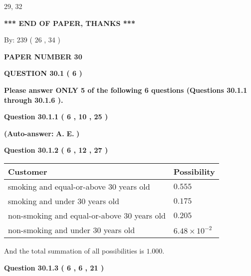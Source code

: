 \documentclass[12pt]{article}
\begin{document}
29,  %
32
 
   
   
   
   
\vspace{1.0in} 
{\textbf{\large{ *** END OF PAPER, THANKS *** }}} 
   
   
\hspace{1.0in} By: 
         239 (          26 ,           34 )
   
   
   
   
\newpage 
\setcounter{page}{ 
    30001 } 
   
   
 {\textbf{ \Large{ PAPER NUMBER           30  }}}
   
   
   
   
  
\vspace{0.2in}
  
{\textbf{\Large{QUESTION
30.1 
 (           6 )
}}}
  
  
{\textbf{\Large{Please answer ONLY  %
           5  %
 of the following  %
           6  %
 questions (Questions  %
30.1.1 %
 through  %
30.1.6 %
 ). }}}
   
   
  
  
{\textbf{\large{Question
30.1.1 
 (           6 ,          10 ,          25 )
}}}
 
 
{\textbf{(Auto-answer:}}
{\textbf{\large{
A.}}}
{\textbf{\large{
E.}}}
{\textbf{)}}
 
 
  
  
{\textbf{\large{Question
30.1.2 
 (           6 ,          12 ,          27 )
}}}

 
\noindent
\begin{tabular}{|l|l|}
\hline
Customer & Possibility \\
\hline
smoking  and  %
equal-or-above 30 years old &
  $ %
0.555$ \\
\hline
smoking  and  %
under 30 years old &
  $ %
0.175$ \\
\hline
 non-smoking and  %
equal-or-above 30 years old &
  $ %
0.205$ \\
\hline
 non-smoking and  %
under 30 years old &
  $ %
6.48 \times 10^{-2}$ \\
\hline
\end{tabular}
 
\noindent
 And the total summation of all possibilities is $  %
1.000 $.
 
  
  
{\textbf{\large{Question
30.1.3 
 (           6 ,           6 ,          21 )
}}}
\end{document}
